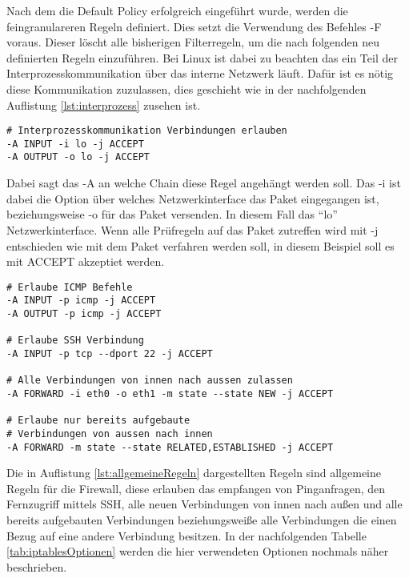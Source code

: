 \vspace{\baselineskip}
Nach dem die Default Policy erfolgreich eingeführt wurde, werden die feingranulareren Regeln definiert. Dies setzt die Verwendung des Befehles -F voraus. Dieser löscht alle bisherigen Filterregeln, um die nach folgenden neu definierten Regeln einzuführen. Bei Linux ist dabei zu beachten das ein Teil der Interprozesskommunikation über das interne Netzwerk läuft. Dafür ist es nötig diese Kommunikation zuzulassen, dies geschieht wie in der nachfolgenden Auflistung \ref{lst:interprozess} zusehen ist. 
\newline
\lstset{
	basicstyle=\footnotesize, frame=tb,
	xleftmargin=.2\textwidth, xrightmargin=.2\textwidth
}
\begin{lstlisting}[caption={Interprozesskommunikation zulassen},label=lst:interprozess]
# Interprozesskommunikation Verbindungen erlauben
-A INPUT -i lo -j ACCEPT
-A OUTPUT -o lo -j ACCEPT
\end{lstlisting}
\vspace{\baselineskip}
Dabei sagt das -A an welche Chain diese Regel angehängt werden soll. Das -i ist dabei die Option über welches Netzwerkinterface das Paket eingegangen ist, beziehungsweise -o für das Paket versenden. In diesem Fall das ``lo'' Netzwerkinterface. Wenn alle Prüfregeln auf das Paket zutreffen wird mit -j entschieden wie mit dem Paket verfahren werden soll, in diesem Beispiel soll es mit ACCEPT akzeptiet werden. 
\newline
\lstset{
	basicstyle=\footnotesize, frame=tb,
	xleftmargin=.2\textwidth, xrightmargin=.2\textwidth
}
\begin{lstlisting}[caption={Weitere allgemeine Firewallregeln},label=lst:allgemeineRegeln]
# Erlaube ICMP Befehle
-A INPUT -p icmp -j ACCEPT
-A OUTPUT -p icmp -j ACCEPT

# Erlaube SSH Verbindung
-A INPUT -p tcp --dport 22 -j ACCEPT

# Alle Verbindungen von innen nach aussen zulassen
-A FORWARD -i eth0 -o eth1 -m state --state NEW -j ACCEPT

# Erlaube nur bereits aufgebaute 
# Verbindungen von aussen nach innen
-A FORWARD -m state --state RELATED,ESTABLISHED -j ACCEPT
\end{lstlisting}
\vspace{\baselineskip}
Die in Auflistung \ref{lst:allgemeineRegeln} dargestellten Regeln sind allgemeine Regeln für die Firewall, diese erlauben das empfangen von Pinganfragen, den Fernzugriff mittels SSH, alle neuen Verbindungen von innen nach außen und alle bereits aufgebauten Verbindungen beziehungsweiße alle Verbindungen die einen Bezug auf eine andere Verbindung besitzen. In der nachfolgenden Tabelle \ref*{tab:iptablesOptionen} werden die hier verwendeten Optionen nochmals näher beschrieben.
